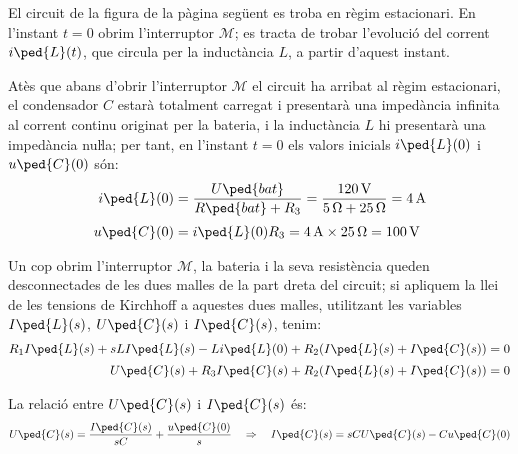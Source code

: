 \begin{exemple}\label{ex:CircuitLaplace}
	\addcontentsxms{\CircuitLaplace}
    El circuit de la figura de la pàgina següent es troba en règim estacionari. En
    l'instant $t=0$ obrim l'interruptor $\mathscr{M}$; es tracta de trobar
    l'evolució del corrent $i\ped{L}(t)$, que circula per la inductància
    $L$, a partir d'aquest instant.

      Atès que abans d'obrir l'interruptor $\mathscr{M}$ el circuit ha arribat al
     règim estacionari, el condensador $C$ estarà totalment carregat  i
     presentarà una impedància infinita al corrent continu originat per la
     bateria, i la inductància $L$ hi presentarà una impedància nuŀla;
     per tant, en l'instant $t=0$ els valors inicials $i\ped{L}(0)$ i
     $u\ped{C}(0)$ són:
     \begin{align*}
        i\ped{L}(0) &= \frac{U\ped{bat}}{R\ped{bat} + R_3} = \frac{\qty{120}{V}}
        {\qty{5}{\ohm} + \qty{25}{\ohm}} = \qty{4}{A} \\[0.5ex]
        u\ped{C}(0) &= i\ped{L}(0) R_3 = \qty{4}{A}\times \qty{25}{\ohm} = \qty{100}{V}
     \end{align*}

  \begin{center}
	
\end{center}

    Un cop obrim l'interruptor $\mathscr{M}$, la bateria i la seva resistència
    queden desconnectades de les dues malles de la part dreta del circuit; si apliquem la llei de les tensions de Kirchhoff  a aquestes
    dues malles, utilitzant les variables $I\ped{L}(s)$, $U\ped{C}(s)$ i
    $I\ped{C}(s)$, tenim:
    \begin{align*}
        R_1 I\ped{L}(s) + s L I\ped{L}(s) - L i\ped{L}(0) + R_2
        (I\ped{L}(s) + I\ped{C}(s)) &=0 \\[0.5ex]
        U\ped{C}(s) + R_3 I\ped{C}(s) + R_2 (I\ped{L}(s) + I\ped{C}(s)) &=0
    \end{align*}

    La relació entre $U\ped{C}(s)$ i $I\ped{C}(s)$ és:
    \begin{equation*}
        U\ped{C}(s) = \frac{I\ped{C}(s)}{s C} + \frac{u\ped{C}(0)}{s}
        \quad\Rightarrow\quad I\ped{C}(s) = s C U\ped{C}(s) - C u\ped{C}(0)
    \end{equation*}


\end{exemple}

